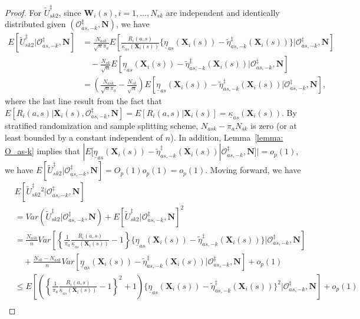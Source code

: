 \documentclass[12pt]{article}
\newcommand{\bX}{\boldsymbol{X}}
\newcommand{\bW}{\boldsymbol{W}}
\newcommand{\bN}{\boldsymbol{N}}
\begin{document}
\begin{proof}
For $\widetilde{U}_{sk2}^\ddagger$, since $\bW_i(s), i=1,\dots, N_{sk}$ are independent and identically distributed given $(\mathcal{O}_{as,-k}^\ddagger,\bN)$, we have
\begin{align*}
    E[\widetilde{U}_{sk2}^\ddagger|\mathcal{O}_{as,-k}^\ddagger,\bN] &=   \frac{N_{ask}}{\sqrt{n}\pi_a} E\left[\frac{R_i(a,s)}{\underline{\kappa}_{as}(\bX_i(s))}\{\underline{\eta}_{as}(\bX_i(s))-\widetilde{\eta}_{as,-k}^\ddagger(\bX_i(s))\}\bigg|\mathcal{O}_{as,-k}^\ddagger,\bN\right] \\
    &\quad - \frac{N_{sk}}{\sqrt{n}}  E[\underline{\eta}_{as}(\bX_i(s))-\widetilde{\eta}_{as,-k}^\ddagger(\bX_i(s))|\mathcal{O}_{as,-k}^\ddagger,\bN] \\
    &= \left(\frac{N_{ask}}{\sqrt{n}\pi_a} - \frac{N_{sk}}{\sqrt{n}}\right) E[\underline{\eta}_{as}(\bX_i(s))-\widetilde{\eta}_{as,-k}^\ddagger(\bX_i(s))|\mathcal{O}_{as,-k}^\ddagger,\bN],
\end{align*}
where the last line result from the fact that $E[R_i(a,s)|\bX_i(s), \mathcal{O}_{as,-k}^\ddagger,\bN] = E[R_i(a,s)|\bX_i(s)] = \underline{\kappa}_{as}(\bX_i(s))$. By stratified randomization and sample splitting scheme, $N_{ask}-\pi_a N_{sk}$ is zero (or at least bounded by a constant independent of $n$). In addition, Lemma~\ref{lemma: O_as-k} implies that $|E[\underline{\eta}_{as}(\bX_i(s))-\widetilde{\eta}_{as,-k}^\ddagger(\bX_i(s))|\mathcal{O}_{as,-k}^\ddagger,\bN]| = o_p(1)$, we have $E[\widetilde{U}_{sk2}^\ddagger|\mathcal{O}_{as,-k}^\ddagger,\bN] = O_p(1)o_p(1) =o_p(1)$. Moving forward, we have
\begin{align*}
    & E[\widetilde{U}_{sk2}^\ddagger{}^2|\mathcal{O}_{as,-k}^\ddagger,\bN]\\ &= Var(\widetilde{U}_{sk2}^\ddagger|\mathcal{O}_{as,-k}^\ddagger,\bN) + E[\widetilde{U}_{sk2}^\ddagger|\mathcal{O}_{as,-k}^\ddagger,\bN]^2 \\
    &= \frac{N_{ask}}{n}Var\left[\left\{\frac{1}{\pi_a} \frac{R_i(a,s)}{\underline{\kappa}_{as}(\bX_i(s))}-1\right\}\{\underline{\eta}_{as}(\bX_i(s))-\widetilde{\eta}_{as,-k}^\ddagger(\bX_i(s))\}\bigg|\mathcal{O}_{as,-k}^\ddagger,\bN\right] \\
    &\quad + \frac{N_{sk}-N_{ask}}{n}Var\left[\underline{\eta}_{as}(\bX_i(s))-\widetilde{\eta}_{as,-k}^\ddagger(\bX_i(s))\bigg|\mathcal{O}_{as,-k}^\ddagger,\bN\right] + o_p(1) \\
    &\le E\left[\left(\left\{\frac{1}{\pi_a} \frac{R_i(a,s)}{\underline{\kappa}_{as}(\bX_i(s))}-1\right\}^2+1\right)\{\underline{\eta}_{as}(\bX_i(s))-\widetilde{\eta}_{as,-k}^\ddagger(\bX_i(s))\}^2\bigg|\mathcal{O}_{as,-k}^\ddagger,\bN\right] + o_p(1)\\

\end{align*}
\end{proof}
\end{document}
